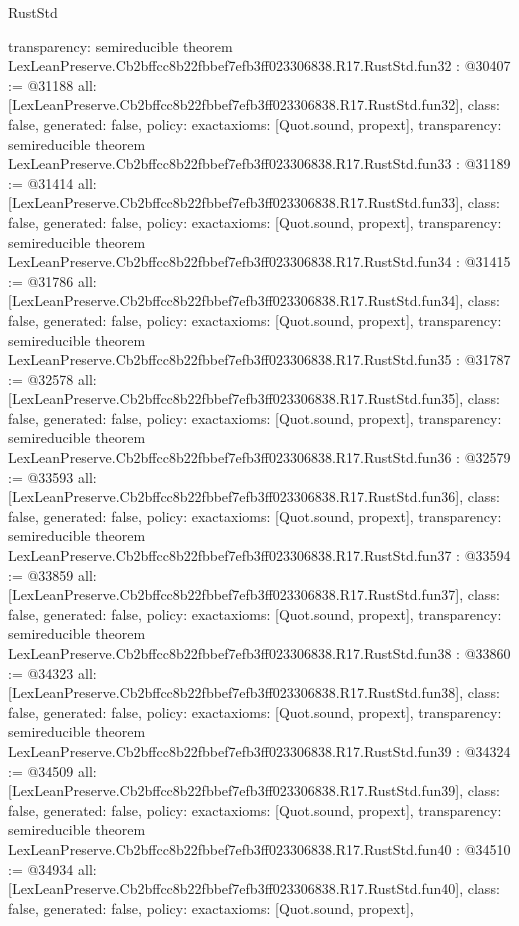 \begin{lexlean}{RustStd}
\begin{coremodule}
{  transparency: semireducible
}
theorem LexLeanPreserve.Cb2bffcc8b22fbbef7efb3ff023306838.R17.RustStd.fun32 : @30407 := @31188 {
  all: [LexLeanPreserve.Cb2bffcc8b22fbbef7efb3ff023306838.R17.RustStd.fun32],
  class: false,
  generated: false,
  policy: exact{axioms: [Quot.sound, propext]},
  transparency: semireducible
}
theorem LexLeanPreserve.Cb2bffcc8b22fbbef7efb3ff023306838.R17.RustStd.fun33 : @31189 := @31414 {
  all: [LexLeanPreserve.Cb2bffcc8b22fbbef7efb3ff023306838.R17.RustStd.fun33],
  class: false,
  generated: false,
  policy: exact{axioms: [Quot.sound, propext]},
  transparency: semireducible
}
theorem LexLeanPreserve.Cb2bffcc8b22fbbef7efb3ff023306838.R17.RustStd.fun34 : @31415 := @31786 {
  all: [LexLeanPreserve.Cb2bffcc8b22fbbef7efb3ff023306838.R17.RustStd.fun34],
  class: false,
  generated: false,
  policy: exact{axioms: [Quot.sound, propext]},
  transparency: semireducible
}
theorem LexLeanPreserve.Cb2bffcc8b22fbbef7efb3ff023306838.R17.RustStd.fun35 : @31787 := @32578 {
  all: [LexLeanPreserve.Cb2bffcc8b22fbbef7efb3ff023306838.R17.RustStd.fun35],
  class: false,
  generated: false,
  policy: exact{axioms: [Quot.sound, propext]},
  transparency: semireducible
}
theorem LexLeanPreserve.Cb2bffcc8b22fbbef7efb3ff023306838.R17.RustStd.fun36 : @32579 := @33593 {
  all: [LexLeanPreserve.Cb2bffcc8b22fbbef7efb3ff023306838.R17.RustStd.fun36],
  class: false,
  generated: false,
  policy: exact{axioms: [Quot.sound, propext]},
  transparency: semireducible
}
theorem LexLeanPreserve.Cb2bffcc8b22fbbef7efb3ff023306838.R17.RustStd.fun37 : @33594 := @33859 {
  all: [LexLeanPreserve.Cb2bffcc8b22fbbef7efb3ff023306838.R17.RustStd.fun37],
  class: false,
  generated: false,
  policy: exact{axioms: [Quot.sound, propext]},
  transparency: semireducible
}
theorem LexLeanPreserve.Cb2bffcc8b22fbbef7efb3ff023306838.R17.RustStd.fun38 : @33860 := @34323 {
  all: [LexLeanPreserve.Cb2bffcc8b22fbbef7efb3ff023306838.R17.RustStd.fun38],
  class: false,
  generated: false,
  policy: exact{axioms: [Quot.sound, propext]},
  transparency: semireducible
}
theorem LexLeanPreserve.Cb2bffcc8b22fbbef7efb3ff023306838.R17.RustStd.fun39 : @34324 := @34509 {
  all: [LexLeanPreserve.Cb2bffcc8b22fbbef7efb3ff023306838.R17.RustStd.fun39],
  class: false,
  generated: false,
  policy: exact{axioms: [Quot.sound, propext]},
  transparency: semireducible
}
theorem LexLeanPreserve.Cb2bffcc8b22fbbef7efb3ff023306838.R17.RustStd.fun40 : @34510 := @34934 {
  all: [LexLeanPreserve.Cb2bffcc8b22fbbef7efb3ff023306838.R17.RustStd.fun40],
  class: false,
  generated: false,
  policy: exact{axioms: [Quot.sound, propext]},
}
\end{coremodule}
\end{lexlean}
